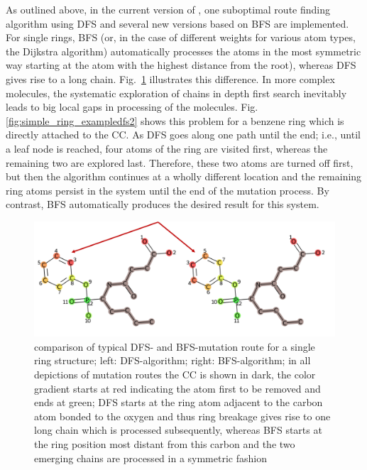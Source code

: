As outlined above, in the current version of {\trafo}, one suboptimal route finding algorithm using DFS and several new versions based on BFS are implemented.
For single rings, BFS (or, in the case of different weights for various atom types, the Dijkstra algorithm) automatically processes the atoms in the most symmetric way starting at the atom with the highest distance from the root), whereas DFS gives rise to a long chain. Fig.~\ref{fig:comparison_dfs_bfs} illustrates this difference.
In more complex molecules, the systematic exploration of chains in
depth first search inevitably leads to big local gaps in processing
of the molecules. Fig. \ref{fig:simple_ring_exampledfs2} shows this problem for a benzene ring which
is directly attached to the CC. As DFS goes along one path
until the end; i.e., until a leaf node is reached, four atoms of the
ring are visited first, whereas the remaining two are explored
last. Therefore, these two atoms are turned off first, but then the
algorithm continues at a wholly different location and the remaining
ring atoms persist in the system until the end of the mutation process.
By contrast, BFS automatically produces the desired result for this system. 


\begin{figure}
\includegraphics[scale=1.4]{simple_ring_exampledfs.png}

\caption{comparison of typical DFS- and BFS-mutation route for a single ring structure; left: DFS-algorithm; right: BFS-algorithm; in all depictions of mutation routes the CC is shown in dark, the color gradient starts at red indicating the atom first to be removed and ends at green; DFS
starts at the ring atom adjacent to the carbon atom bonded to the oxygen and thus ring breakage gives rise to one long
chain which is processed subsequently, whereas BFS starts at the ring position most distant from this carbon and the two emerging chains are processed in a symmetric fashion
}
\label{fig:comparison_dfs_bfs}
\end{figure}



